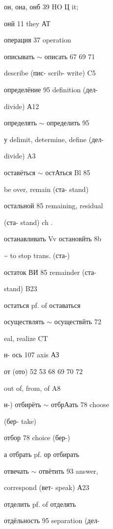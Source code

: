 \begin{minipage}[t]{0.475\textwidth}
\raggedright
\noindent он, она, онб 39 HO Ц it;\par
\noindent онй 11 they АТ\par
\noindent операция 37 operation\par
\noindent описывать $\sim$ описать 67 69 71\par
\noindent describe (пис- scrib- write) C5\par
\noindent определёние 95 definition (дел-\par
\noindent divide) А12\par
\noindent определять $\sim$ определить 95\par
\noindent у delimit, determine, define (дел-\par
\noindent divide) A3\par
\noindent оставёться $\sim$ остАться Bl 85\par
\noindent be over, remain (ста- stand)\par
\noindent остальной 85 remaining, residual\par
\noindent (ста- stand) ch .\par
\noindent останавливать Vv остановйть 8b\par
\noindent \textasciitilde{} to stop trans. (ста-)\par
\noindent остаток ВИ 85 remainder (ста-\par
{} stand) B23\par
\noindent остаться pf. of оставаться\par
\noindent осуществлять $\sim$ осуществйть 72\par
\noindent eal, realize CT\par
\noindent н- ось 107 axis АЗ\par
\noindent от (ото) 52 53 68 69 70 72\par
\noindent out of, from, of A8\par
\noindent н-) отбирёть $\sim$ отбрАать 78 choose\par
\noindent (бер- take)\par
\noindent отбор 78 choice (бер-)\par
\noindent а отбрать pf. ор отбирать\par
\noindent отвечать $\sim$ отвётить 93 answer,\par
\noindent correspond (вет- speak) А23\par
{} отделить pf. of отделять\par
\noindent отдёльность 95 separation (дел-\par

\end{minipage}
